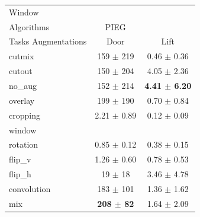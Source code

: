 \begin{tabular}{lcc}
Window & & \\
Algorithms & PIEG & \\
Tasks Augmentations & Door & Lift \\
cutmix          & 159 $\pm$ 219 & 0.46 $\pm$ 0.36 \\
cutout          & 150 $\pm$ 204 & 4.05 $\pm$ 2.36 \\
no\_aug         & 152 $\pm$ 214 & \textbf{4.41 $\pm$ 6.20} \\
overlay         & 199 $\pm$ 190 & 0.70 $\pm$ 0.84 \\
cropping        & 2.21 $\pm$ 0.89 & 0.12 $\pm$ 0.09 \\
window          &  &  \\
rotation        & 0.85 $\pm$ 0.12 & 0.38 $\pm$ 0.15 \\
flip\_v         & 1.26 $\pm$ 0.60 & 0.78 $\pm$ 0.53 \\
flip\_h         & 19 $\pm$ 18 & 3.46 $\pm$ 4.78 \\
convolution     & 183 $\pm$ 101 & 1.36 $\pm$ 1.62 \\
mix             & \textbf{208 $\pm$ 82} & 1.64 $\pm$ 2.09 \\
\end{tabular}